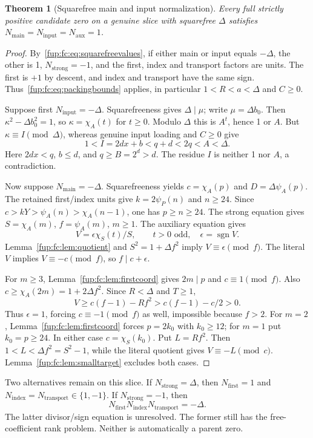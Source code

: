 \documentclass[11pt,letterpaper]{article}
\newtheorem{theorem}{Theorem}[section]
\theoremstyle{definition}\newtheorem{definition}[theorem]{Definition}
\theoremstyle{remark}\newtheorem{remark}[theorem]{Remark}
\newcommand{\D}{\Delta}
\newcommand{\ch}[2]{\chi_{#1}(#2)}\newcommand{\ps}[2]{\psi_{#1}(#2)}
\newcommand{\Nf}{N_{\mathrm{first}}}\newcommand{\Nm}{N_{\mathrm{main}}}\newcommand{\Ni}{N_{\mathrm{input}}}
\newcommand{\Na}{N_{\mathrm{aux}}}\newcommand{\Nk}{N_{\mathrm{index}}}\newcommand{\Nt}{N_{\mathrm{transport}}}
\newcommand{\Ns}{N_{\mathrm{strong}}}
\begin{document}
\begin{theorem}[Squarefree main and input normalization]\label{fup:fc:thm:squarefree}
Every full strictly positive candidate zero on a genuine slice with
squarefree $\D$ satisfies $\Nm=\Ni=\Na=1$.
\end{theorem}
\begin{proof}
By~\eqref{fup:fc:eq:squarefreevalues}, if either main or input equals $-\D$,
the other is 1, $\Ns=-1$, and the first, index and transport factors are
units. The first is $+1$ by descent, and index and transport have the
same sign. Thus~\eqref{fup:fc:eq:packingbounds} applies, in particular
$1<R<a<\D$ and $C\ge0$.

Suppose first $\Ni=-\D$. Squarefreeness gives $\D\mid\mu$;
write $\mu=\D b_0$. Then $\kappa^2-\D b_0^2=1$, so
$\kappa=\ch A t$ for $t\ge0$. Modulo $\D$ this is $A^t$, hence 1 or
$A$. But $\kappa\equiv I\pmod\D$, whereas genuine input loading and
$C\ge0$ give
\[
 1<I=2dx+b<q+d<2q<A<\D.
\]
Here $2dx<q$, $b\le d$, and $q\ge B=2^d>d$.
The residue $I$ is neither 1 nor $A$, a contradiction.

Now suppose $\Nm=-\D$. Squarefreeness yields
$c=\ch A p$ and $D=\D\ps A p$. The retained first/index units give
$k=2\ps P n$ and $n\ge24$. Since
$c>kY>\ps A n>\ch A{n-1}$, one has $p\ge n\ge24$.
The strong equation gives $S=\ch A m$, $f=\ps A m$, $m\ge1$.
The auxiliary equation gives
\[
 V=\epsilon\ch S t/S,\qquad t>0\text{ odd},\quad\epsilon=\operatorname{sgn}V.
\]
Lemma~\ref{fup:fc:lem:quotient} and $S^2=1+\D f^2$ imply
$V\equiv\epsilon\pmod f$. The literal $V$ implies $V\equiv-c\pmod f$,
so $f\mid c+\epsilon$.

For $m\ge3$, Lemma~\ref{fup:fc:lem:firstcoord} gives $2m\mid p$ and
$c\equiv1\pmod f$. Also $c\ge\ch A{2m}=1+2\D f^2$.
Since $R<\D$ and $T\ge1$,
\[
 V\ge c(f-1)-Rf^2>c(f-1)-c/2>0.
\]
Thus $\epsilon=1$, forcing $c\equiv-1\pmod f$ as well, impossible
because $f>2$.
For $m=2$, Lemma~\ref{fup:fc:lem:firstcoord} forces $p=2k_0$ with $k_0\ge12$;
for $m=1$ put $k_0=p\ge24$. In either case $c=\ch S{k_0}$.
Put $L=Rf^2$. Then $1<L<\D f^2=S^2-1$, while the literal quotient gives
$V\equiv-L\pmod c$. Lemma~\ref{fup:fc:lem:smalltarget} excludes both cases.
\end{proof}

Two alternatives remain on this slice. If $\Ns=\D$, then
$\Nf=1$ and $\Nk=\Nt\in\{1,-1\}$. If $\Ns=-1$, then
\begin{equation}
 \Nf\Nk\Nt=-\D.\label{fup:fc:eq:remaining}
\end{equation}
The latter divisor/sign equation is unresolved. The former still has
the free-coefficient rank problem. Neither is automatically a parent zero.
\end{document}
